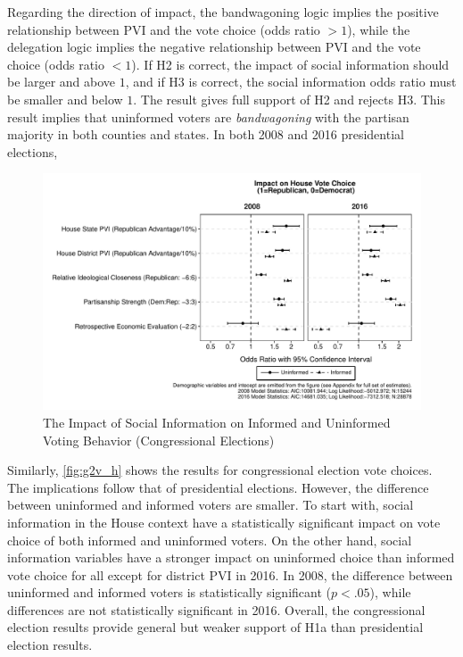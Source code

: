 \documentclass[doc,natbib,12pt]{apa6}\usepackage[]{graphicx}\usepackage[]{color}
\makeatletter
\def\maxwidth{ %
  \ifdim\Gin@nat@width>\linewidth
    \linewidth
  \else
    \Gin@nat@width
  \fi
}
\newenvironment{knitrout}{}{} %
\makeatother
\begin{document}
    \par Regarding the direction of impact, the bandwagoning logic implies the positive relationship between PVI and the vote choice (odds ratio $> 1$), while the delegation logic implies the negative relationship between PVI and the vote choice (odds ratio $ < 1$). If H2 is correct, the impact of social information should be larger and above $1$, and if H3 is correct, the social information odds ratio must be smaller and below $1$. The result gives full support of H2 and rejects H3. This result implies that uninformed voters are \textit{bandwagoning} with the partisan majority in both counties and states. In both 2008 and 2016 presidential elections, 
    
\begin{knitrout}
\color{fgcolor}\begin{figure}[t!!!]

{\centering \includegraphics[width=\maxwidth]{figure/g2v_h-1} 

}

\caption[The Impact of Social Information on Informed and Uninformed Voting Behavior (Congressional Elections)]{The Impact of Social Information on Informed and Uninformed Voting Behavior (Congressional Elections)}\label{fig:g2v_h}
\end{figure}


\end{knitrout}
    
    \par Similarly, \autoref{fig:g2v_h} shows the results for congressional election vote choices. The implications follow that of presidential elections. However, the difference between uninformed and informed voters are smaller. To start with, social information in the House context have a statistically significant impact on vote choice of both informed and uninformed voters. On the other hand, social information variables have a stronger impact on uninformed choice than informed vote choice for all except for district PVI in 2016. In 2008, the difference between uninformed and informed voters is statistically significant ($p<.05$), while differences are not statistically significant in 2016. Overall, the congressional election results provide general but weaker support of H1a than presidential election results. 
\end{document}
